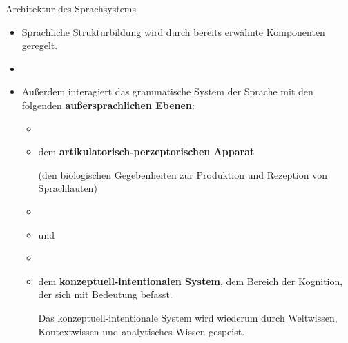 \begin{frame}{Architektur des Sprachsystems}
	
	\begin{itemize}
		\item Sprachliche Strukturbildung wird durch bereits erwähnte Komponenten geregelt.
		\item[]
		\item<2-> Außerdem interagiert das grammatische System der Sprache mit den folgenden \textbf{außersprachlichen Ebenen}:
				
		\begin{itemize}
			\item[]
			\item<3-> dem \textbf{artikulatorisch-perzeptorischen Apparat}\par
				(den biologischen Gegebenheiten zur Produktion und Rezeption von Sprachlauten)
			\item[]
			\item<3->[] und
			\item[]
			\item<4-> dem \textbf{konzeptuell-intentionalen System}, \dash dem Bereich der Kognition,\\der sich mit Bedeutung befasst.\par
				Das konzeptuell-intentionale System wird wiederum durch Weltwissen, Kontextwissen und analytisches Wissen gespeist.
		\end{itemize}
			
	\end{itemize}
		
\end{frame}



				





